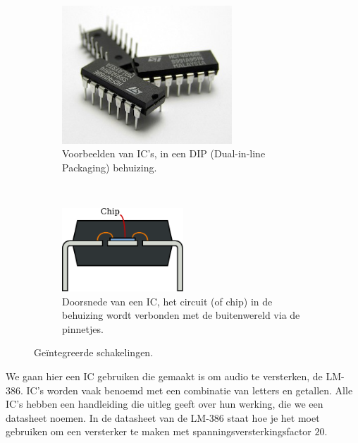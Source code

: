 \documentclass{article}
\begin{document}
			\begin{figure}[htbp]
			\centering
				\begin{subfigure}[b]{0.45\linewidth}
					\centering
					\includegraphics[width=0.7\textwidth]{IC}
					\caption{Voorbeelden van IC's, in een DIP (Dual-in-line Packaging) behuizing.}
					\label{subfig:IC_foto}
				\end{subfigure}
				~
				\begin{subfigure}[b]{0.45\linewidth}
					\centering
				\includegraphics[width=0.5\textwidth]{IC_doorsnede}
				\caption{Doorsnede van een IC, het circuit (of chip) in de behuizing wordt verbonden met de buitenwereld via de pinnetjes. }
				\label{subfig:IC_doorsnede}
				\end{subfigure}
				\caption{Ge\"integreerde schakelingen.}
				\label{fig:IC}
			\end{figure}

			We gaan hier een IC gebruiken die gemaakt is om audio te versterken, de LM-386. IC's worden vaak benoemd met een combinatie van letters en getallen. Alle IC's hebben een handleiding die uitleg geeft over hun werking, die we een datasheet noemen. In de datasheet van de LM-386 staat hoe je het moet gebruiken om een versterker te maken met spanningsversterkingsfactor $20$.
\end{document}
